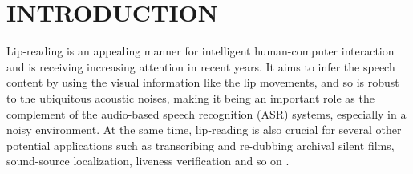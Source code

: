 \documentclass[a4paper, 10pt, conference]{ieeeconf}      %
\begin{document}
	
	\section{INTRODUCTION}
	Lip-reading is an appealing manner for intelligent human-computer interaction and is receiving increasing attention in recent years. It aims to infer the speech content by using the visual information \cite{B2017} like the lip movements, and so is robust to the ubiquitous acoustic noises, making it being an important role as the complement of the audio-based speech recognition (ASR) systems, especially in a noisy environment. At the same time, lip-reading is also crucial for several other potential applications such as transcribing and re-dubbing archival silent films, sound-source localization, liveness verification and so on \cite{Chung}. 
	
\end{document}
